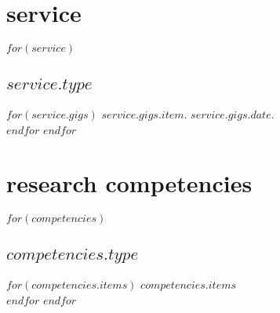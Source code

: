 \documentclass[11pt, letter]{article}
\begin{document}
\section{service}
$for(service)$
\subsection{$service.type$}
$for(service.gigs)$
$service.gigs.item$. $service.gigs.date$.\\[.15cm]
$endfor$
$endfor$


\section{research competencies}
$for(competencies)$
\subsection{\itshape $competencies.type$}
$for(competencies.items)$
$competencies.items$\\[.15cm]
$endfor$
$endfor$
\end{document}
